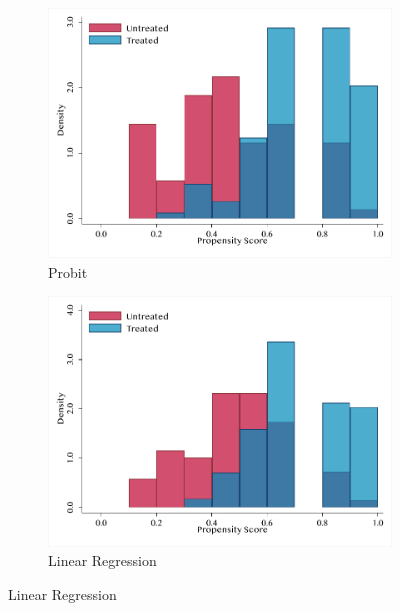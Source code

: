 \begin{figure}[htb]
    \caption{\sc Common Support}
    \label{fig:comSupp}
    \begin{center}
     \begin{subfigure}[b]{0.47\textwidth}
         \centering
         \includegraphics[width=\textwidth]{Figures/commonSupp.pdf}
         \caption{Probit}
     \end{subfigure}
     \begin{subfigure}[b]{0.47\textwidth}
         \centering
         \includegraphics[width=\textwidth]{Figures/commonSuppLin.pdf}
         \caption{Linear Regression}
     \end{subfigure}
    \end{center}
    \vspace{-10pt}
    \scriptsize{}
\end{figure}
